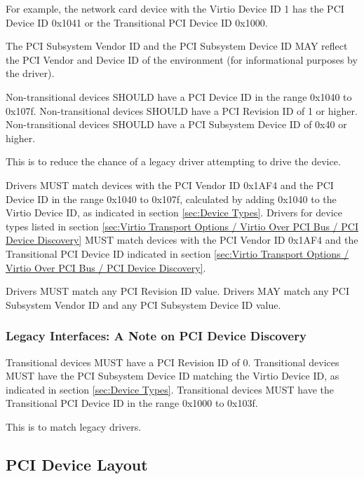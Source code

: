 For example, the network card device with the Virtio Device ID 1
has the PCI Device ID 0x1041 or the Transitional PCI Device ID 0x1000.

The PCI Subsystem Vendor ID and the PCI Subsystem Device ID MAY reflect
the PCI Vendor and Device ID of the environment (for informational purposes by the driver).

Non-transitional devices SHOULD have a PCI Device ID in the range
0x1040 to 0x107f.
Non-transitional devices SHOULD have a PCI Revision ID of 1 or higher.
Non-transitional devices SHOULD have a PCI Subsystem Device ID of 0x40 or higher.

This is to reduce the chance of a legacy driver attempting
to drive the device.

Drivers MUST match devices with the PCI Vendor ID 0x1AF4 and
the PCI Device ID in the range 0x1040 to 0x107f,
calculated by adding 0x1040 to the Virtio Device ID,
as indicated in section \ref{sec:Device Types}.
Drivers for device types listed in section \ref{sec:Virtio
Transport Options / Virtio Over PCI Bus / PCI Device Discovery}
MUST match devices with the PCI Vendor ID 0x1AF4 and
the Transitional PCI Device ID indicated in section
 \ref{sec:Virtio
Transport Options / Virtio Over PCI Bus / PCI Device Discovery}.

Drivers MUST match any PCI Revision ID value.
Drivers MAY match any PCI Subsystem Vendor ID and any
PCI Subsystem Device ID value.

\subsubsection{Legacy Interfaces: A Note on PCI Device Discovery}\label{sec:Virtio Transport Options / Virtio Over PCI Bus / PCI Device Discovery / Legacy Interfaces: A Note on PCI Device Discovery}
Transitional devices MUST have a PCI Revision ID of 0.
Transitional devices MUST have the PCI Subsystem Device ID
matching the Virtio Device ID, as indicated in section \ref{sec:Device Types}.
Transitional devices MUST have the Transitional PCI Device ID in
the range 0x1000 to 0x103f.

This is to match legacy drivers.

\subsection{PCI Device Layout}\label{sec:Virtio Transport Options / Virtio Over PCI Bus / PCI Device Layout}

